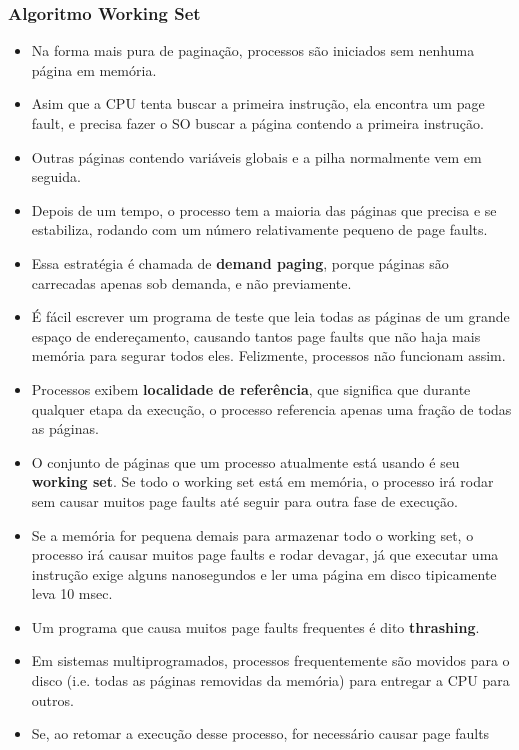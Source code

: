 \documentclass[10pt]{article}
\begin{document}
\subsubsection{Algoritmo Working Set}
\begin{itemize}
    \item Na forma mais pura de paginação, processos são iniciados sem nenhuma página
        em memória.
    \item Asim que a CPU tenta buscar a primeira instrução, ela encontra um page fault,
        e precisa fazer o SO buscar a página contendo a primeira instrução. 
    \item Outras páginas contendo variáveis globais e a pilha normalmente vem em seguida.
    \item Depois de um tempo, o processo tem a maioria das páginas que precisa e se
        estabiliza, rodando com um número relativamente pequeno de page faults. 
    \item Essa estratégia é chamada de \textbf{demand paging}, porque páginas são
        carrecadas apenas sob demanda, e não previamente.
    \item É fácil escrever um programa de teste que leia todas as páginas de um 
        grande espaço de endereçamento, causando tantos page faults que não haja
        mais memória para segurar todos eles. Felizmente, processos não funcionam assim.
    \item Processos exibem \textbf{localidade de referência}, que significa que durante 
        qualquer etapa da execução, o processo referencia apenas uma fração de todas 
        as páginas.
    \item O conjunto de páginas que um processo atualmente está usando é seu 
        \textbf{working set}. Se todo o working set está em memória, o processo irá
        rodar sem causar muitos page faults até seguir para outra fase de execução.
    \item Se a memória for pequena demais para armazenar todo o working set, o processo
        irá causar muitos page faults e rodar devagar, já que executar uma instrução
        exige alguns nanosegundos e ler uma página em disco tipicamente leva 10 msec.
    \item Um programa que causa muitos page faults frequentes é dito \textbf{thrashing}.
    \item Em sistemas multiprogramados, processos frequentemente são movidos para o disco
        (i.e. todas as páginas removidas da memória) para entregar a CPU para outros.
    \item Se, ao retomar a execução desse processo, for necessário causar page faults

\end{itemize}
\end{document}
